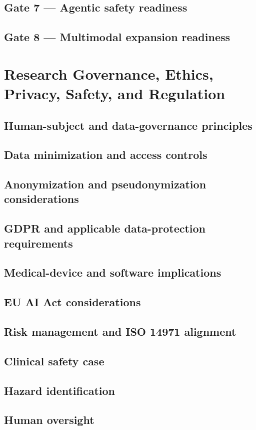 \documentclass[11pt,journal,onecolumn,draftclsnofoot]{IEEEtran}
\begin{document}
\subsection{Gate 7 --- Agentic safety readiness}
\subsection{Gate 8 --- Multimodal expansion readiness}

\section{Research Governance, Ethics, Privacy, Safety, and Regulation}
\subsection{Human-subject and data-governance principles}
\subsection{Data minimization and access controls}
\subsection{Anonymization and pseudonymization considerations}
\subsection{GDPR and applicable data-protection requirements}
\subsection{Medical-device and software implications}
\subsection{EU AI Act considerations}
\subsection{Risk management and ISO 14971 alignment}
\subsection{Clinical safety case}
\subsection{Hazard identification}
\subsection{Human oversight}
\end{document}
